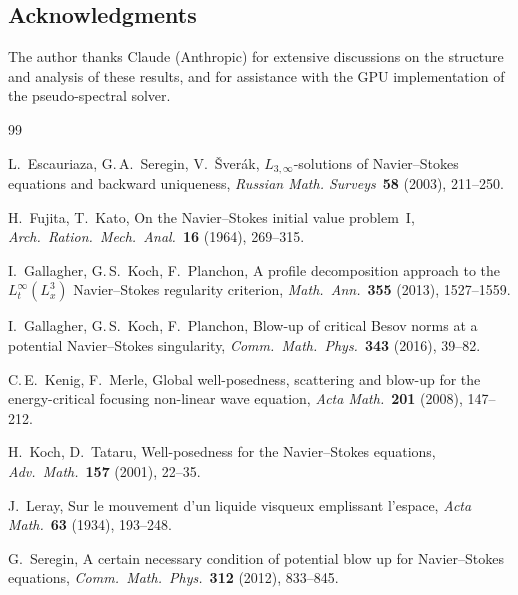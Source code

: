 \documentclass[11pt]{article}
\theoremstyle{definition}
\begin{document}
\subsection*{Acknowledgments}

The author thanks Claude (Anthropic) for extensive
discussions on the structure and analysis of these results,
and for assistance with the GPU implementation of the
pseudo-spectral solver.


\begin{thebibliography}{99}

L.~Escauriaza, G.\,A.~Seregin, V.~\v{S}ver\'ak,
$L_{3,\infty}$-solutions of Navier--Stokes equations and
backward uniqueness,
\emph{Russian Math. Surveys}~\textbf{58} (2003), 211--250.

H.~Fujita, T.~Kato,
On the Navier--Stokes initial value problem~I,
\emph{Arch.\ Ration.\ Mech.\ Anal.}~\textbf{16} (1964),
269--315.

I.~Gallagher, G.\,S.~Koch, F.~Planchon,
A profile decomposition approach to the $L^{\infty}_t(L^3_x)$
Navier--Stokes regularity criterion,
\emph{Math.\ Ann.}~\textbf{355} (2013), 1527--1559.

I.~Gallagher, G.\,S.~Koch, F.~Planchon,
Blow-up of critical Besov norms at a potential
Navier--Stokes singularity,
\emph{Comm.\ Math.\ Phys.}~\textbf{343} (2016), 39--82.

C.\,E.~Kenig, F.~Merle,
Global well-posedness, scattering and blow-up for the
energy-critical focusing non-linear wave equation,
\emph{Acta Math.}~\textbf{201} (2008), 147--212.

H.~Koch, D.~Tataru,
Well-posedness for the Navier--Stokes equations,
\emph{Adv.\ Math.}~\textbf{157} (2001), 22--35.

J.~Leray,
Sur le mouvement d'un liquide visqueux emplissant l'espace,
\emph{Acta Math.}~\textbf{63} (1934), 193--248.

G.~Seregin,
A certain necessary condition of potential blow up for
Navier--Stokes equations,
\emph{Comm.\ Math.\ Phys.}~\textbf{312} (2012), 833--845.

\end{thebibliography}
\end{document}
